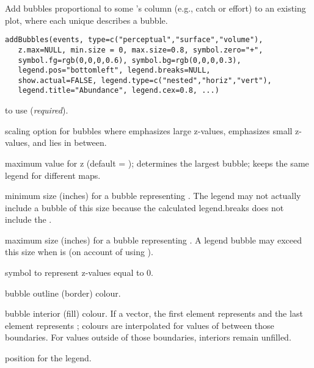 \documentclass[letterpaper]{book}
\begin{document}
%
\begin{Description}\relax
Add bubbles proportional to some 's  column
(e.g., catch or effort) to an existing plot, where each unique
 describes a bubble.
\end{Description}
%
\begin{Usage}
\begin{verbatim}
addBubbles(events, type=c("perceptual","surface","volume"),
   z.max=NULL, min.size = 0, max.size=0.8, symbol.zero="+",
   symbol.fg=rgb(0,0,0,0.6), symbol.bg=rgb(0,0,0,0.3),
   legend.pos="bottomleft", legend.breaks=NULL,
   show.actual=FALSE, legend.type=c("nested","horiz","vert"),
   legend.title="Abundance", legend.cex=0.8, ...)
\end{verbatim}
\end{Usage}
%
\begin{Arguments}
\begin{ldescription}
\item[\code{events}]  to use (\emph{required}).
\item[\code{type}] scaling option for bubbles where 
emphasizes large z-values,  emphasizes small z-values,
and  lies in between.
\item[\code{z.max}] maximum value for z (default = );
determines the largest bubble; keeps the same legend for different
maps.
\item[\code{min.size}] minimum size (inches) for a bubble representing
.  The legend may not actually include a bubble of
this size because the calculated legend.breaks does not include the
.
\item[\code{max.size}] maximum size (inches) for a bubble representing
.  A legend bubble may exceed this size when
 is  (on account of using
).
\item[\code{symbol.zero}] symbol to represent z-values equal to 0.
\item[\code{symbol.fg}] bubble outline (border) colour.
\item[\code{symbol.bg}] bubble interior (fill) colour.  If a vector, the
first element represents  and the last
element represents ; colours are interpolated
for values of  between those boundaries.  For values
outside of those boundaries, interiors remain unfilled.
\item[\code{legend.pos}] position for the legend.

\end{ldescription}
\end{Arguments}
\end{document}
